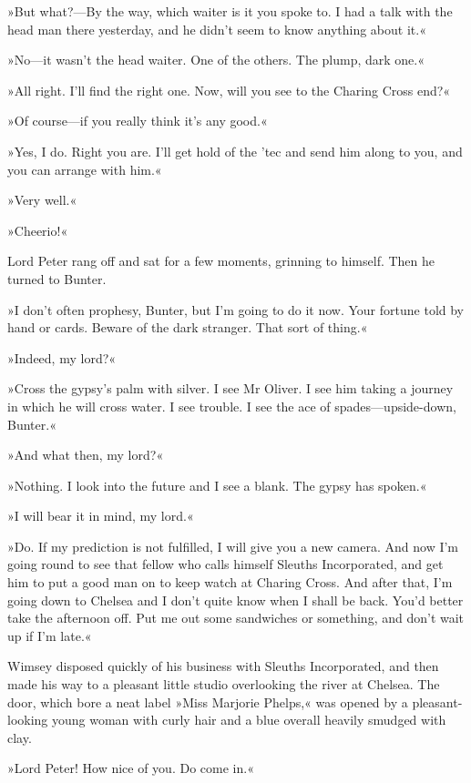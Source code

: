 »But what?---By the way, which waiter is it you spoke to. I had a talk with the head man there yesterday, and he didn't seem to know anything about it.«

»No\allowbreak---\allowbreak it wasn't the head waiter. One of the others. The plump, dark one.«

»All right. I'll find the right one. Now, will you see to the Charing Cross end?«

»Of course\allowbreak---\allowbreak if you really think it's any good.«

»Yes, I do. Right you are. I'll get hold of the 'tec and send him along to you, and you can arrange with him.«

»Very well.«

»Cheerio!«

Lord Peter rang off and sat for a few moments, grinning to himself. Then he turned to Bunter.

»I don't often prophesy, Bunter, but I'm going to do it now. Your fortune told by hand or cards. Beware of the dark stranger. That sort of thing.«

»Indeed, my lord?«

»Cross the gypsy's palm with silver. I see Mr Oliver. I see him taking a journey in which he will cross water. I see trouble. I see the ace of spades\allowbreak---\allowbreak upside-down, Bunter.«

»And what then, my lord?«

»Nothing. I look into the future and I see a blank. The gypsy has spoken.«

»I will bear it in mind, my lord.«

»Do. If my prediction is not fulfilled, I will give you a new camera. And now I'm going round to see that fellow who calls himself Sleuths Incorporated, and get him to put a good man on to keep watch at Charing Cross. And after that, I'm going down to Chelsea and I don't quite know when I shall be back. You'd better take the afternoon off. Put me out some sandwiches or something, and don't wait up if I'm late.«

Wimsey disposed quickly of his business with Sleuths Incorporated, and then made his way to a pleasant little studio overlooking the river at Chelsea. The door, which bore a neat label »Miss Marjorie Phelps,« was opened by a pleasant-looking young woman with curly hair and a blue overall heavily smudged with clay.

»Lord Peter! How nice of you. Do come in.«

